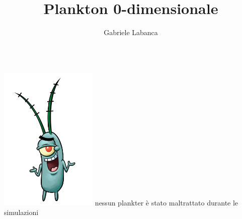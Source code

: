 \documentclass{beamer}
\title{Plankton 0-dimensionale}
\author{Gabriele Labanca}
\begin{document}
\frame{\titlepage}







\begin{frame}
  \begin{columns}
    \includegraphics[height=7cm]{../img/mrplankton}
    nessun plankter è stato maltrattato durante le simulazioni
  \end{columns}

\end{frame}
\end{document}
